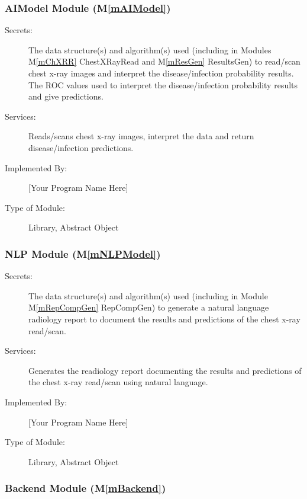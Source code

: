 \documentclass[12pt, titlepage]{article}
\newcommand{\mref}[1]{M\ref{#1}}
\begin{document}
\subsubsection{AIModel Module (\mref{mAIModel})}

\begin{description}
\item[Secrets:] The data structure(s) and algorithm(s) used (including in
  Modules \mref{mChXRR} ChestXRayRead and \mref{mResGen} ResultsGen) to
  read/scan chest x-ray images and interpret the disease/infection probability
  results. The ROC values used to interpret the disease/infection probability
  results and give predictions.
\item[Services:] Reads/scans chest x-ray images, interpret the data and return
  disease/infection predictions.
\item[Implemented By:] [Your Program Name Here]
\item[Type of Module:] Library, Abstract Object
\end{description}

\subsubsection{NLP Module (\mref{mNLPModel})}

\begin{description}
\item[Secrets:] The data structure(s) and algorithm(s) used (including in
  Module \mref{mRepCompGen} RepCompGen) to generate a natural language
  radiology report to document the results and predictions of the chest x-ray
  read/scan.
\item[Services:] Generates the readiology report documenting the results and
  predictions of the chest x-ray read/scan using natural language.
\item[Implemented By:] [Your Program Name Here]
\item[Type of Module:] Library, Abstract Object
\end{description}

\subsubsection{Backend Module (\mref{mBackend})}
\end{document}
